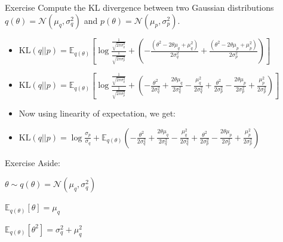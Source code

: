 \documentclass{beamer}
\begin{document}
\begin{frame}{Exercise}
    Compute the KL divergence between two Gaussian distributions $q(\theta) = \mathcal{N}(\mu_q, \sigma_q^2)$ and $p(\theta) = \mathcal{N}(\mu_p, \sigma_p^2)$.

    \begin{itemize}
        \item \pause $\text{KL}(q||p) = \mathbb{E}_{q(\theta)} \left[ \log \frac{\frac{1}{\sqrt{2\pi\sigma_q^2}}}{\frac{1}{\sqrt{2\pi\sigma_p^2}}} + \left( -\frac{(\theta^2 - 2\theta\mu_q + \mu_q^2)}{2\sigma_q^2} + \frac{(\theta^2 - 2\theta\mu_p + \mu_p^2)}{2\sigma_p^2} \right) \right]$
        \item \pause $\text{KL}(q||p) = \mathbb{E}_{q(\theta)} \left[ \log \frac{\frac{1}{\sqrt{2\pi\sigma_q^2}}}{\frac{1}{\sqrt{2\pi\sigma_p^2}}} + \left( -\frac{\theta^2}{2\sigma_q^2} + \frac{2\theta\mu_q}{2\sigma_q^2} - \frac{\mu_q^2}{2\sigma_q^2} + \frac{\theta^2}{2\sigma_p^2} - \frac{2\theta\mu_p}{2\sigma_p^2} + \frac{\mu_p^2}{2\sigma_p^2} \right) \right]$
        \item \pause Now using linearity of expectation, we get:
        \item \pause $\text{KL}(q||p) = \log \frac{\sigma_p}{\sigma_q} + \mathbb{E}_{q(\theta)} (-\frac{\theta^2}{2\sigma_q^2} + \frac{2\theta\mu_q}{2\sigma_q^2} - \frac{\mu_q^2}{2\sigma_q^2} + \frac{\theta^2}{2\sigma_p^2} - \frac{2\theta\mu_p}{2\sigma_p^2} + \frac{\mu_p^2}{2\sigma_p^2})$
    \end{itemize}
    
    
\end{frame}

\begin{frame}{Exercise}
Aside:

$\theta \sim q(\theta) = \mathcal{N}(\mu_q, \sigma_q^2)$

$\mathbb{E}_{q(\theta)} \left[ \theta \right] = \mu_q$

$\mathbb{E}_{q(\theta)} \left[ \theta^2 \right] = \sigma_q^2 + \mu_q^2$

\end{frame}
\end{document}
